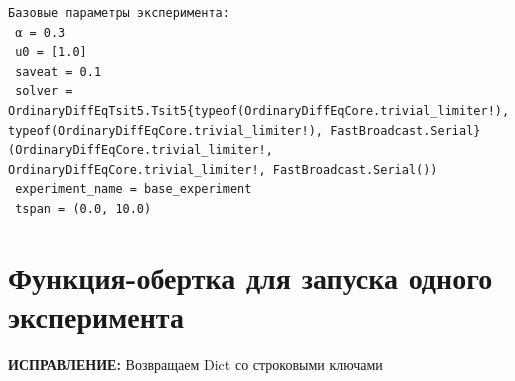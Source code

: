\documentclass[
  english,
  russian,
  12pt,
  a4paper,
  DIV=11,
  numbers=noendperiod]{scrreprt}
\newenvironment{Shaded}{\begin{snugshade}}{\end{snugshade}}
\newcommand{\CommentTok}[1]{\textcolor[rgb]{0.37,0.37,0.37}{#1}}
\newcommand{\ControlFlowTok}[1]{\textcolor[rgb]{0.00,0.23,0.31}{\textbf{#1}}}
\newcommand{\FloatTok}[1]{\textcolor[rgb]{0.68,0.00,0.00}{#1}}
\newcommand{\FunctionTok}[1]{\textcolor[rgb]{0.28,0.35,0.67}{#1}}
\newcommand{\KeywordTok}[1]{\textcolor[rgb]{0.00,0.23,0.31}{\textbf{#1}}}
\newcommand{\NormalTok}[1]{\textcolor[rgb]{0.00,0.23,0.31}{#1}}
\newcommand{\OperatorTok}[1]{\textcolor[rgb]{0.37,0.37,0.37}{#1}}
\newcommand{\SpecialCharTok}[1]{\textcolor[rgb]{0.37,0.37,0.37}{#1}}
\newcommand{\StringTok}[1]{\textcolor[rgb]{0.13,0.47,0.30}{#1}}
\begin{document}
\begin{Shaded}
\end{Shaded}

\begin{verbatim}
Базовые параметры эксперимента:
 α = 0.3
 u0 = [1.0]
 saveat = 0.1
 solver = OrdinaryDiffEqTsit5.Tsit5{typeof(OrdinaryDiffEqCore.trivial_limiter!), typeof(OrdinaryDiffEqCore.trivial_limiter!), FastBroadcast.Serial}(OrdinaryDiffEqCore.trivial_limiter!, OrdinaryDiffEqCore.trivial_limiter!, FastBroadcast.Serial())
 experiment_name = base_experiment
 tspan = (0.0, 10.0)
\end{verbatim}

\section{Функция-обертка для запуска одного
эксперимента}\label{ux444ux443ux43dux43aux446ux438ux44f-ux43eux431ux435ux440ux442ux43aux430-ux434ux43bux44f-ux437ux430ux43fux443ux441ux43aux430-ux43eux434ux43dux43eux433ux43e-ux44dux43aux441ux43fux435ux440ux438ux43cux435ux43dux442ux430}

\textbf{ИСПРАВЛЕНИЕ:} Возвращаем Dict со строковыми ключами
\end{document}
